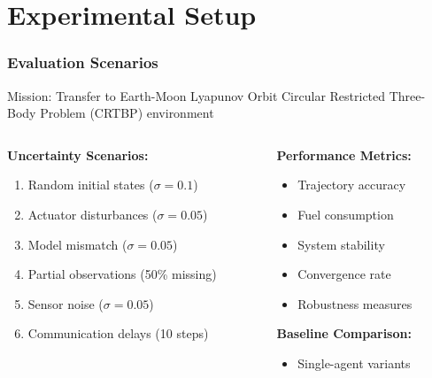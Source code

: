 \documentclass[
    11pt, %
    aspectratio=169, %
]{beamer}
\begin{document}
\section{Experimental Setup}

\begin{frame}
	\frametitle{Evaluation Scenarios}
	
	\begin{block}{Mission: Transfer to Earth-Moon Lyapunov Orbit}
		Circular Restricted Three-Body Problem (CRTBP) environment
	\end{block}
	
	\begin{columns}[t]
		\begin{column}{0.5\textwidth}
			\textbf{Uncertainty Scenarios:}
			\begin{enumerate}
				\item Random initial states ($\sigma = 0.1$)
				\item Actuator disturbances ($\sigma = 0.05$)
				\item Model mismatch ($\sigma = 0.05$)
				\item Partial observations (50\% missing)
				\item Sensor noise ($\sigma = 0.05$)
				\item Communication delays (10 steps)
			\end{enumerate}
		\end{column}
		\begin{column}{0.5\textwidth}
			\textbf{Performance Metrics:}
			\begin{itemize}
				\item Trajectory accuracy
				\item Fuel consumption
				\item System stability
				\item Convergence rate
				\item Robustness measures
			\end{itemize}
			
			\textbf{Baseline Comparison:}
			\begin{itemize}
				\item Single-agent variants
			\end{itemize}
		\end{column}
	\end{columns}
\end{frame}
\end{document}

